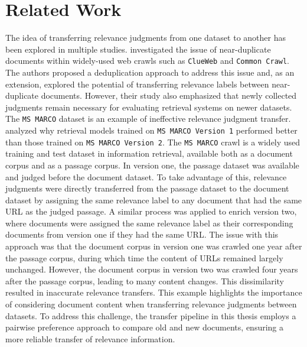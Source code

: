 \chapter{Related Work}\label{related-work}

The idea of transferring relevance judgments from one dataset to another has been explored in multiple studies. \citet{froebe:2021} investigated the issue of near-duplicate documents within widely-used web crawls such as \texttt{ClueWeb} and \texttt{Common Crawl}. The authors proposed a deduplication approach to address this issue and, as an extension, explored the potential of transferring relevance labels between near-duplicate documents. However, their study also emphasized that newly collected judgments remain necessary for evaluating retrieval systems on newer datasets. The \texttt{MS MARCO} dataset is an example of ineffective relevance judgment transfer. \citet{froebe:2022} analyzed  why retrieval models trained on \texttt{MS MARCO Version 1} performed better than those trained on \texttt{MS MARCO Version 2}. The \texttt{MS MARCO} crawl is a widely used training and test dataset in information retrieval, available both as a document corpus and as a passage corpus. In version one, the passage dataset was available and judged before the document dataset. To take advantage of this, relevance judgments were directly transferred from the passage dataset to the document dataset by assigning the same relevance label to any document that had the same URL as the judged passage. A similar process was applied to enrich version two, where documents were assigned the same relevance label as their corresponding documents from version one if they had the same URL. The issue with this approach was that the document corpus in version one was crawled one year after the passage corpus, during which time the content of URLs remained largely unchanged. However, the document corpus in version two was crawled four years after the passage corpus, leading to many content changes. This dissimilarity resulted in inaccurate relevance transfers. This example highlights the importance of considering document content when transferring relevance judgments between datasets. To address this challenge, the transfer pipeline in this thesis employs a pairwise preference approach to compare old and new documents, ensuring a more reliable transfer of relevance information.
